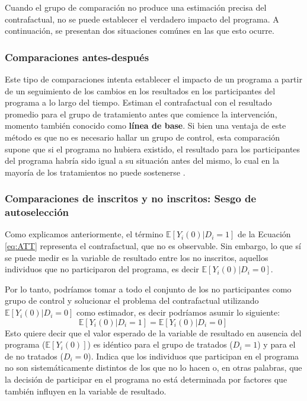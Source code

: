 \documentclass[../../main.tex]{subfiles}
\begin{document}
Cuando el grupo de comparación no produce una estimación precisa del contrafactual, no se
puede establecer el verdadero impacto del programa. A continuación, se presentan dos
situaciones comúnes en las que esto ocurre.

\subsubsection{Comparaciones antes-después}
Este tipo de comparaciones intenta establecer el impacto de un programa a partir de un
seguimiento de los cambios en los resultados en los participantes del programa a lo largo
del tiempo. Estiman el contrafactual con el resultado promedio para el grupo de
tratamiento antes que comience la intervención, momento también conocido como
\textbf{línea de base}. Si bien una ventaja de este método es que no es necesario hallar
un grupo de control, esta comparación supone que si el programa no hubiera existido,
el resultado para los participantes del programa habría sido igual a su situación antes
del mismo, lo cual en la mayoría de los tratamientos no puede sostenerse
\cite{gertler-2016}.

\subsubsection{Comparaciones de inscritos y no inscritos: Sesgo de autoselección}
Como explicamos anteriormente, el término \(\mathbb{E} \left[Y_i(0)|D_i=1\right]\) de la
Ecuación \ref{eq:ATT} representa el contrafactual, que no es observable. Sin embargo, lo
que sí se puede medir es la variable de resultado entre los no inscritos, aquellos
individuos que no participaron del programa, es decir \(\mathbb{E}
\left[Y_i(0)|D_i=0\right]\).

Por lo tanto, podríamos tomar a todo el conjunto de los no participantes como grupo de
control y solucionar el problema del contrafactual utilizando \(\mathbb{E}
\left[Y_i(0)|D_i=0\right]\) como estimador, es decir podríamos asumir lo siguiente:
\begin{equation}
    \mathbb{E} \left[Y_i(0)|D_i=1\right] = \mathbb{E} \left[Y_i(0)|D_i=0\right]\
    \label{eq:supuesto-1}  %
\end{equation}
Esto quiere decir que el valor esperado de la variable de resultado en ausencia del
programa (\(\mathbb{E}\left[Y_i(0)\right]\)) es idéntico para el grupo de tratados (\(D_i =
1\)) y para el de no tratados (\(D_i = 0\)). Indica que los individuos que participan en el
programa no son sistemáticamente distintos de los que no lo hacen \cite{bernal} o, en
otras palabras, que la decisión de participar en el programa no está determinada por
factores que también influyen en la variable de resultado.
\end{document}
